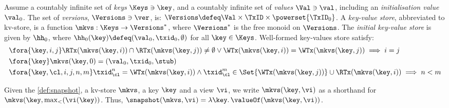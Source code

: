 \begin{definition}
\label{def:mkvs-appendix}
Assume a countably infinite set of \emph{keys} $\Keys \ni \key$, 
and a countably infinite set of  \emph{values} $\Val \ni \val$, 
including an \emph{initialisation value} $\val_0 $.
The set of \emph{versions}, $\Versions \ni \ver$, is: $\Versions \defeq \Val \times \TxID \times \powerset{\TxID_{0}}$. 
A \emph{key-value store}, abbreviated to kv-store,  is a function $\mkvs: \Keys \rightarrow \Versions^{\ast}$, 
where $\Versions^{\ast}$ is the free monoid on $\Versions$. 
The \emph{initial key-value store} is given by $\hh_0$, where 
$\hh_{0}(\key)\defeq  (\val_0, \txid_0, \emptyset)$ for
all $\key \in \Keys$.
Well-formed key-values store satisfy:
\begin{align}
& \fora{\key, i, j} 
\RTx(\mkvs(\key, i)) \cap \RTx(\mkvs(\key, j)) \neq \emptyset \lor
\WTx(\mkvs(\key, i)) = \WTx(\mkvs(\key, j))
\implies i = j  \\
& \fora{\key} \mkvs(\key, 0) = (\val_0, \txid_0, \stub) \\
& \fora{ \key, \cl, i,j, n, m} 
\txid_{\cl}^{n} = \WTx(\mkvs(\key,i)) \wedge \txid_{\cl}^{m} \in
\Set{\WTx(\mkvs(\key,j))} \cup \RTx(\mkvs(\key, i)) \implies n < m
\end{align}
\end{definition}

Given the \cref{def:snapshot}, 
a kv-store $\mkvs$, a key $\key$ and a view $\vi$, 
we write $\mkvs(\key, \vi)$ as a shorthand for 
$\mkvs(\key, \max_{<}(\vi(\key))$. Thus, $\snapshot(\mkvs, \vi) = \lambda \key \ldotp \valueOf(\mkvs(\key, \vi))$. 
